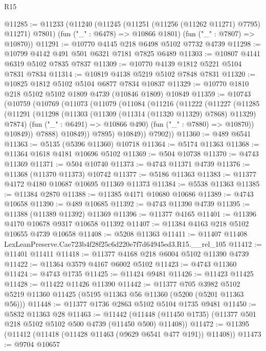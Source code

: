 \begin{lexlean}{R15}
\begin{coremodule}
{{{{{{{{{{{@11285 := @11233
    (@11240
      (@11245 (@11251 (@11256 (@11262 @11271) @7795) @11271) @7801)
      (fun ("_" : @6478) => @10866 @1801)
      (fun ("_" : @7807) => @10870))
@11291 := @10770 @4145 @218 @6498 @5102 @7732 @4739
@11298 := @10799 @4142 @491 @501 @6321 @7181 @7825 @6489
@11303 := @10807 @4141 @6319 @5102 @7835 @7837
@11309 := @10770 @4139 @1812 @5221 @5104 @7831 @7834
@11314 := @10819 @4138 @5219 @5102 @7848 @7831
@11320 := @10825 @1812 @5102 @5104 @6877 @7834 @10837
@11329 := @10770 @1810 @218 @5102 @5102 @1809 @4739 (@10846 @1809) @10849
@11359 := @10743
    (@10759
      (@10769
        (@11073
          (@11079
            (@11084
              (@11216
                (@11222
                  (@11227
                    (@11285
                      (@11291
                        (@11298
                          (@11303 (@11309 (@11314 (@11320 @11329) @7868) @11329) @7874)
                          (fun ("_" : @6491) => @10866 @490)
                          (fun ("_" : @7880) => @10870))
                        @10849))
                    @7888)
                  @10849))
              @7895)
            @10849))
        @7902))
@11360 := @489 @6541
@11363 := @5135 (@5396 @11360) @10718
@11364 := @5174 @11363
@11368 := @11364 @1618 @4181 @10696 @5102
@11369 := @504 @10738
@11370 := @4743 @11369
@11371 := @504 @10740
@11373 := @4743 @11371 @4739
@11376 := @11368 (@11370 @11373) @10742
@11377 := @5186 @11363
@11383 := @11377 @4172 @4180 @10687 @10695 @11369 @11373
@11384 := @5538 @11363
@11385 := @11384 @2870
@11388 := @11385 @4171 @10680 @10686
@11389 := @4743 @10658
@11390 := @489 @10685
@11392 := @4743 @11390 @4739
@11395 := @11388 (@11389 @11392) @11369
@11396 := @11377 @4165
@11401 := @11396 @4170 @10678 @9317 @10658 @11392
@11407 := @11384 @4163 @218 @5102 @10655 @4739 @10658
@11408 := @5208 @11363
@11411 := @11407 @11408 LexLeanPreserve.Cae723b4f28f25c6d220e7f7d64945ed3.R15.__rel_105
@11412 := @11401 @11411
@11418 := @11377 @4168 @218 @6004 @5102 @11390 @4739
@11422 := @11364 @3579 @4167 @6002 @5102
@11423 := @4743 @11360
@11424 := @4743 @1735
@11425 := @11424 @9481
@11426 := @11423 @11425
@11428 := @11422 @11426 @11390
@11442 := @11377
    @705
    @3982
    @5102
    @5219
    @11360
    @11425
    (@5195 @11363 @56 @11360 (@5200 (@5201 @11363 @56)))
@11448 := @11377 @1736 @2863 @5102 @5104 @1735 @9481
@11450 := @5832 @11363 @28
@11463 := @11442
    (@11448 (@11450 @1735) (@11377 @501 @218 @5102 @5102 @500 @4739 (@11450 @500) @11408))
@11472 := @11395 (@11412 (@11418 (@11428 @11463 (@9629 @6541 @477 @191)) @11408))
@11473 := @9704 @10657
}}}}}}}}}}}
\end{coremodule}
\end{lexlean}
